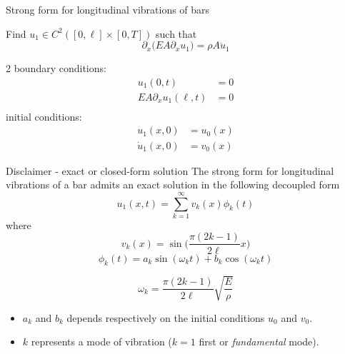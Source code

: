 \documentclass[aspectratio=169]{beamer}
\begin{document}
\begin{frame}{Strong form for longitudinal vibrations of bars}
  \begin{center}
  \end{center}
  \vspace{0.3cm}
  \begin{block}{}
    Find $u_{1}\in C^2([0,\ell]\times[0,T])$ such that
    \[
      \partial_{x}\big(EA \partial_{x}u_{1}\big) = \rho A \ddot{u}_1
    \]
    \begin{multicols}{2}
      boundary conditions:
      \[
        \begin{aligned}
          u_1(0, t)                    & = 0 \\
          EA \partial_{x} u_1(\ell, t) & = 0 \\
        \end{aligned}
      \]
      initial conditions:
      \[
        \begin{aligned}
          u_1(x, 0)       & = u_0(x) \\
          \dot{u}_1(x, 0) & = v_0(x)
        \end{aligned}
      \]
    \end{multicols}
    \vspace{0.01cm}
  \end{block}
\end{frame}


\begin{frame}{Disclaimer - exact or closed-form solution}
  The strong form for longitudinal vibrations of a bar admits an exact solution in the following decoupled form
  $$u_{1}(x,t)=\sum_{k=1}^{\infty} v_{k}(x)\phi_{k}(t)$$
  where
  $$v_{k}(x)=\sin\Big(\frac{\pi(2k-1)}{2\ell}x\Big)$$
  $$\phi_{k}(t)=a_{k}\sin(\omega_{k}t)+b_{k}\cos(\omega_{k}t)$$
  \vspace{-0.3cm}
  \begin{block}{}
    $$\omega_{k}=\frac{\pi(2k-1)}{2\ell}\sqrt{\frac{E}{\rho}}$$
  \end{block}
  \begin{itemize}
    \item  $a_{k}$ and $b_{k}$ depends respectively on the initial conditions $u_{0}$ and $v_{0}$.
    \item $k$ represents a mode of vibration ($k=1$ first or \emph{fundamental} mode).
  \end{itemize}
\end{frame}
\end{document}
